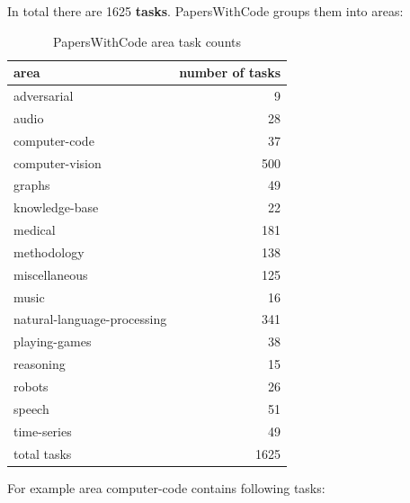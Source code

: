 \documentclass[11pt]{report}
\begin{document}
In total there are 1625 \textbf{tasks}. PapersWithCode groups them into areas:

\begin{table}[htbp]
\centering
  \caption{PapersWithCode area task counts}
  \begin{tabular}{|l|r|}
\hline
area & number of tasks\\
\hline
adversarial & 9\\
audio & 28\\
computer-code & 37\\
computer-vision & 500\\
graphs & 49\\
knowledge-base & 22\\
medical & 181\\
methodology & 138\\
miscellaneous & 125\\
music & 16\\
natural-language-processing & 341\\
playing-games & 38\\
reasoning & 15\\
robots & 26\\
speech & 51\\
time-series & 49\\
\hline
total tasks & 1625\\
\hline
  \end{tabular}
  \end{table}

For example area computer-code contains following tasks:
\end{document}
